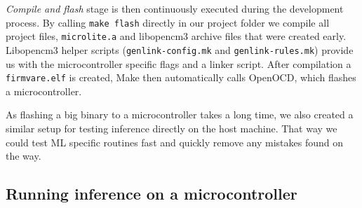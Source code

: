 \textit{Compile and flash} stage is then continuously executed during the development process.
By calling \verb|make flash| directly in our project folder we compile all project files, \verb|microlite.a| and libopencm3 archive files that were created early.
Libopencm3 helper scripts (\verb|genlink-config.mk| and \verb|genlink-rules.mk|) provide us with the microcontroller specific flags and a linker script.
After compilation a \verb|firmvare.elf| is created, Make then automatically calls OpenOCD, which flashes a microcontroller.

As flashing a big binary to a microcontroller takes a long time, we also created a similar setup for testing inference directly on the host machine.
That way we could test ML specific routines fast and quickly remove any mistakes found on the way.


\subsection{ Running inference on a microcontroller}

